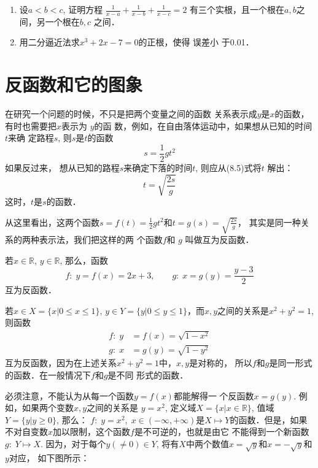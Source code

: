\begin{enumerate}
\item 设$a<b<c$, 证明方程
$\frac{1}{x-a}+\frac{1}{x-b}+\frac{1}{x-c}=2$
有三个实根，且一个根在$a,b$之间，另一个根在$b,c$
之间．
\item 用二分逼近法求$x^3+2x-7=0$的正根，使得 误差小
于0.01．

\end{enumerate}


\section{反函数和它的图象}

在研究一个问题的时候，不只是把两个变量之间的函数
关系表示成$y$是$x$的函数，有时也需要把$x$表示为 $y$的函
数，例如，在自由落体运动中，如果想从已知的时间$t$来确
定路程$s$, 则$s$是$t$的函数
\begin{equation}
    s=\frac{1}{2}gt^2
\end{equation}
如果反过来，
想从已知的路程$s$来确定下落的时间$t$, 则应从(8.5)式将$t$
解出：
\begin{equation}
    t=\sqrt{\frac{2s}{g}}
\end{equation}
这时，$t$是$s$的函数．

从这里看出，这两个函数$s=f(t)=\frac{1}{2}gt^2$和$t=g(s)=
\sqrt{\frac{2s}{g}}$，
其实是同一种关系的两种表示法，我们把这样的两
个函数$f$和
$g$ 叫做互为反函数．

\begin{example}
    若$x\in\mathbb{R}$, $y\in\mathbb{R}$, 那么，函数
\[f:\; y=f(x)=2x+3,\qquad g:\; x=g(y)=\frac{y-3}{2}\]
互为反函数．
\end{example}


\begin{example}
 若$x\in X=\{x|0\le x\le 1\}$, $y\in Y=\{y|0\le y\le 1\}$，而$x,y$之间的关系是$x^2+y^2=1$, 则函数
\[\begin{split}
  f:\; y&=f(x)=\sqrt{1-x^2}\\
g:\; x&=g(y)=\sqrt{1-y^2}   
\end{split}\]
互为反函数，因为在上述关系$x^2+y^2=1$中，$x,y$是对称的，
所以$f$和$g$是同一形式的函数．在一般情况下$f$和$g$是不同
形式的函数．
\end{example}

必须注意，不能认为从每一个函数$y=f(x)$都能解得一
个反函数$x=g(y)$. 例如，如果两个变数$x,y$之间的关系是
$y=x^2$, 定义域$X=\{x|x\in\mathbb{R}\}$, 值域$Y=\{y|y\ge 0\}$, 那么：
$f:\; y=x^2,\; x\in (-\infty,+\infty)$是$X\mapsto Y$的函数．但是，如果
不对自变数$x$加以限制，这个函数$f$是不可逆的，也就是由它
不能得到一个新函数$g:\; Y\mapsto X$. 因为，对于每个$y(\ne 0)\in Y$, 
将有$X$中两个数值$x=\sqrt{y}$和$x=-\sqrt{y}$和$y$对应，
如下图所示：

